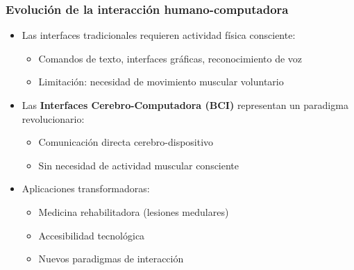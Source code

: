 \documentclass[10pt,thmsa]{beamer}
\theoremstyle{plain}
\begin{document}
\begin{frame}
\frametitle{Evolución de la interacción humano-computadora}

\begin{itemize}
\item Las interfaces tradicionales requieren actividad física consciente:
      \begin{itemize}
      \item Comandos de texto, interfaces gráficas, reconocimiento de voz
      \item Limitación: necesidad de movimiento muscular voluntario
      \end{itemize}
\vspace{0.5em}      
\item Las \textbf{Interfaces Cerebro-Computadora (BCI)} representan un paradigma revolucionario:
      \begin{itemize}
      \item Comunicación directa cerebro-dispositivo
      \item Sin necesidad de actividad muscular consciente
      \end{itemize}
\vspace{0.5em}
\item Aplicaciones transformadoras:
      \begin{itemize}
      \item Medicina rehabilitadora (lesiones medulares)
      \item Accesibilidad tecnológica
      \item Nuevos paradigmas de interacción
      \end{itemize}
\end{itemize}

\end{frame}
\end{document}
